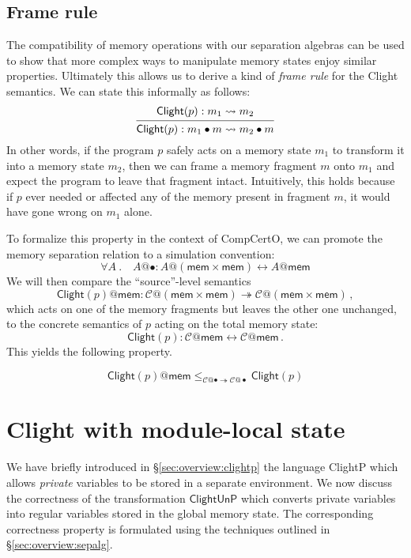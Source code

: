 \documentclass[acmsmall,screen,review,anonymous]{acmart}
\newcommand{\kw}[1]{\ensuremath{ \mathsf{#1} }}
\newcommand{\Clight}{\ensuremath{ \mathsf{Clight} }}
\begin{document}

\subsection{Frame rule} %

The compatibility of memory operations with our separation algebras
can be used to show that
more complex ways to manipulate memory states
enjoy similar properties.
Ultimately this allows us to derive
a kind of \emph{frame rule} for the Clight semantics.
We can state this informally as follows:
\[
  \begin{prooftree}
    \hypo{\Clight(p) : m_1 \leadsto m_2}
    \infer1{\Clight(p) : m_1 \bullet m \leadsto m_2 \bullet m}
  \end{prooftree}
\]
In other words,
if the program $p$ safely acts on a memory state $m_1$
to transform it into a memory state $m_2$,
then we can frame a memory fragment $m$ onto $m_1$
and expect the program to leave that fragment intact.
Intuitively, this holds because
if $p$ ever needed or affected any of the memory present
in fragment $m$,
it would have gone wrong on $m_1$ alone.

To formalize this property in the context of CompCertO,
we can promote the memory separation relation
to a simulation convention:
\[
  \forall A \:.\quad
  A@{\bullet} : A@(\kw{mem} \times \kw{mem}) \leftrightarrow A@\kw{mem}
\]
We will then compare the ``source''-level semantics
\[
  \Clight(p)@\kw{mem} :
    \mathcal{C}@(\kw{mem} \times \kw{mem}) \twoheadrightarrow
    \mathcal{C}@(\kw{mem} \times \kw{mem})
  \,,
\]
which acts on one of the memory fragments
but leaves the other one unchanged,
to the concrete semantics of $p$ acting on the total memory state:
\[
  \Clight(p) : \mathcal{C}@\kw{mem} \leftrightarrow \mathcal{C}@\kw{mem}
  \,.
\]
This yields the following property.

\begin{lemma}
\[
  \Clight(p)@\kw{mem}
  \le_{\mathcal{C}@{\bullet} \twoheadrightarrow \mathcal{C}@{\bullet}}
  \Clight(p)
\]
\end{lemma}



\section{Clight with module-local state} \label{sec:appendix:clightp} %

We have briefly introduced in \S\ref{sec:overview:clightp}
the language ClightP which allows \emph{private} variables
to be stored in a separate environment.
We now discuss the correctness of
the transformation $\kw{ClightUnP}$
which converts private variables into regular variables
stored in the global memory state.
The corresponding correctness property is
formulated using the techniques outlined in \S\ref{sec:overview:sepalg}.
\end{document}
